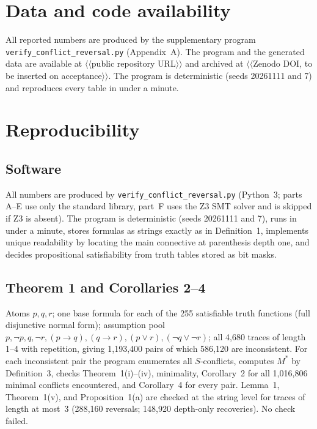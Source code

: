 \documentclass[11pt,reqno]{amsart}
\theoremstyle{plain}
\theoremstyle{definition}
\newcommand{\Mstar}{M^{*}}
\newcommand{\placeholder}[1]{{\normalfont\sffamily\color{red!60!black}$\langle\!\langle$#1$\rangle\!\rangle$}}
\begin{document}
\section*{Data and code availability}
All reported numbers are produced by the supplementary program
\texttt{verify\_conflict\_reversal.py} (Appendix~A). The program and the generated
data are available at \placeholder{public repository URL} and archived at
\placeholder{Zenodo DOI, to be inserted on acceptance}. The program is deterministic
(seeds 20261111 and 7) and reproduces every table in under a minute.

\appendix
\section{Reproducibility}
\subsection{Software}
All numbers are produced by \texttt{verify\_conflict\_reversal.py} (Python~3; parts
A--E use only the standard library, part~F uses the Z3 SMT solver and is skipped if
Z3 is absent). The program is deterministic (seeds 20261111 and 7), runs in under a
minute, stores formulas as strings exactly as in Definition~1, implements unique
readability by locating the main connective at parenthesis depth one, and decides
propositional satisfiability from truth tables stored as bit masks.

\subsection{Theorem 1 and Corollaries 2--4}
Atoms $p,q,r$; one base formula for each of the 255 satisfiable truth functions
(full disjunctive normal form); assumption pool
$p,\neg p,q,\neg r,(p\rightarrow q),(q\rightarrow r),(p\vee r),(\neg q\vee\neg r)$;
all 4{,}680 traces of length 1--4 with repetition, giving 1{,}193{,}400 pairs of
which 586{,}120 are inconsistent. For each inconsistent pair the program enumerates
all $S$-conflicts, computes $\Mstar$ by Definition~3, checks Theorem~1(i)--(iv),
minimality, Corollary~2 for all 1{,}016{,}806 minimal conflicts encountered, and
Corollary~4 for every pair. Lemma~1, Theorem~1(v), and Proposition~1(a) are checked
at the string level for traces of length at most~3 (288{,}160 reversals; 148{,}920
depth-only recoveries). No check failed.
\end{document}
